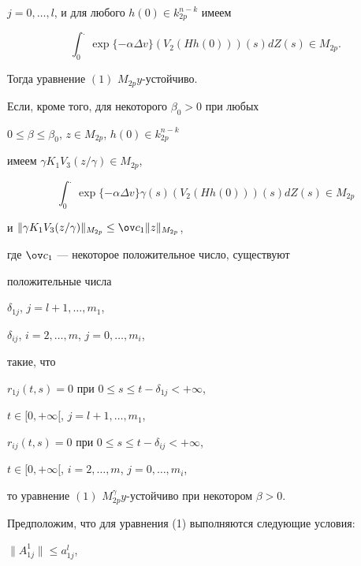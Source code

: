 \begin{thm}
$j = 0,\dotsc, l$, и для любого $h(0) \in k_{2p}^{n-k}$ имеем 


\begin{equation}


\int_0^{\displaystyle .}\exp \{-\alpha \Delta v\}(V_2(Hh(0)))(s)dZ(s) 


\in M_{2p}.


\end{equation}


Тогда уравнение $(1)$ $M_{2p}y$-устойчиво. 


Если, кроме того, для некоторого $\beta_0 > 0$ при любых 


$0 \le \beta \le \beta_0$, $z \in M_{2p}$, $h(0) \in k_{2p}^{n-k}$ 


имеем $\gamma K_1V_3(z/\gamma ) \in M_{2p}$, 


\begin{equation}


\int_0^{\displaystyle .}\exp \{-\alpha \Delta v\}\gamma (s)


(V_2(Hh(0)))(s)dZ(s) \in M_{2p}


\end{equation}


и $\|\gamma K_1V_3(z/\gamma )\|_{M_{2p}} \le \ov c_1\|z\|_{M_{2p}}$, 


где $\ov c_1$ --- некоторое положительное число, существуют 


положительные числа 


$\delta_{1j}$, $j = l + 1,\dotsc, m_1$, 


$\delta_{ij}$, $i = 2,\dotsc, m$, $j = 0,\dotsc, m_i$, 


такие, что 


$r_{1j}(t,s) = 0$ при $0 \le s \le t - \delta_{1j} < + \infty$, 


$t \in [0, +\infty [$, $j = l + 1,\dotsc, m_1$, 


$r_{ij}(t,s) = 0$ при $0 \le s \le t - \delta_{ij} < + \infty$, 


$t \in [0, +\infty [$, $i = 2,\dotsc, m$, $j = 0,\dotsc, m_i$, 


то уравнение $(1)$ $M_{2p}^\gamma y$-устойчиво при некотором $\beta > 0$.


\end{thm}





Предположим, что для уравнения (1) выполняются следующие условия: 


$\|A^1_{1j}\| \le a^l_{1j}$, 



